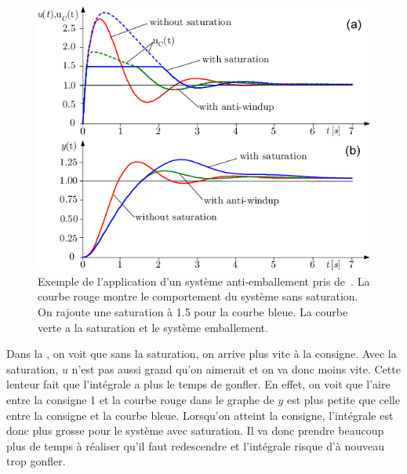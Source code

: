 \begin{figure}
  \centering
  \includegraphics[width=0.6\linewidth]{schmidwindup.png}
  \caption{Exemple de l'application d'un système anti-emballement pris de~\cite{schmid2005windup}.
  La courbe rouge montre le comportement du système sans saturation.
  On rajoute une saturation à \num{1.5} pour la courbe bleue.
  La courbe verte a la saturation et le système emballement.}
  \label{fig:schmidwindup}
\end{figure}

Dans la , on voit que sans la saturation,
on arrive plus vite à la consigne.
Avec la saturation, $u$ n'est pas aussi grand qu'on aimerait et on va donc
moins vite.
Cette lenteur fait que l'intégrale a plus le temps de gonfler.
En effet, on voit que l'aire entre la consigne 1 et la courbe rouge dans
le graphe de $y$ est plus petite que celle entre la consigne et la courbe bleue.
Lorsqu'on atteint la consigne, l'intégrale est donc plus grosse pour le système
avec saturation.
Il va donc prendre beaucoup plus de temps à réaliser qu'il faut redescendre
et l'intégrale risque d'à nouveau trop gonfler.

